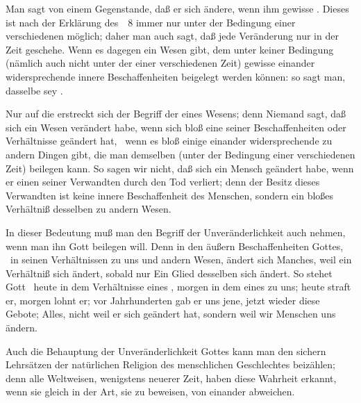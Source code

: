 \begin{aufza} 
\item Man sagt von einem Gegenstande, daß er sich ändere, wenn ihm gewisse . Dieses ist nach der Erklärung des \ \no\,8 immer nur unter der Bedingung einer verschiedenen  möglich; daher man auch sagt, daß jede Veränderung nur in der Zeit geschehe. Wenn es dagegen ein Wesen gibt, dem unter keiner Bedingung (nämlich auch nicht unter der einer verschiedenen Zeit) gewisse einander widersprechende innere Beschaffenheiten beigelegt werden können: so sagt man, dasselbe sey .
\begin{RWanm}
Nur auf die  erstreckt sich der Begriff der  eines Wesens; denn Niemand sagt, daß sich ein Wesen verändert habe, wenn sich bloß eine seiner  Beschaffenheiten oder Verhältnisse geändert hat, \dh\ wenn es bloß einige einander widersprechende  zu andern Dingen gibt, die man demselben (unter der Bedingung einer verschiedenen Zeit) beilegen kann. So sagen wir nicht, daß sich ein Mensch geändert habe, wenn er einen seiner Verwandten durch den Tod verliert; denn der Besitz dieses Verwandten ist keine innere Beschaffenheit des Menschen, sondern ein bloßes Verhältniß desselben zu andern Wesen.
\end{RWanm}
\item In dieser Bedeutung muß man den Begriff der Unveränderlichkeit auch nehmen, wenn man ihn Gott beilegen will. Denn in den äußern Beschaffenheiten Gottes, \dh\ in seinen Verhältnissen zu uns und andern Wesen, ändert sich Manches, weil ein Verhältniß sich ändert, sobald nur Ein Glied desselben sich ändert. So stehet Gott \zB\ heute in dem Verhältnisse eines , morgen in dem eines  zu uns; heute straft er, morgen lohnt er; vor Jahrhunderten gab er uns jene, jetzt wieder diese Gebote; Alles, nicht weil er sich geändert hat, sondern weil wir Menschen uns ändern.~
\item Auch die Behauptung der Unveränderlichkeit Gottes kann man den sichern Lehrsätzen der natürlichen Religion des menschlichen Geschlechtes beizählen; denn alle Weltweisen, wenigstens neuerer Zeit, haben diese Wahrheit erkannt, wenn sie gleich in der Art, sie zu beweisen, von einander abweichen.

\end{aufza}

